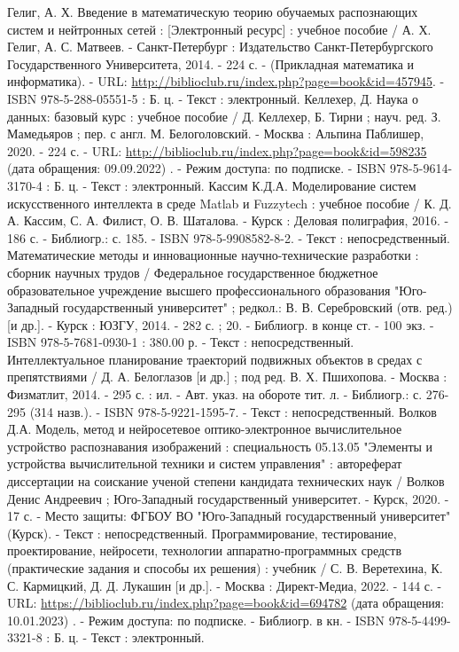 \begin{thebibliography}{50}
    Гелиг, А. Х.    Введение в математическую теорию обучаемых распознающих систем и нейтронных сетей : [Электронный ресурс] : учебное пособие / А. Х. Гелиг, А. С. Матвеев. - Санкт-Петербург : Издательство Санкт-Петербургского Государственного Университета, 2014. - 224 с. - (Прикладная математика и информатика). - URL: \url{http://biblioclub.ru/index.php?page=book&id=457945}. - ISBN 978-5-288-05551-5 : Б. ц. - Текст : электронный.
     Келлехер, Д.    Наука о данных: базовый курс : учебное пособие / Д. Келлехер, Б. Тирни ; науч. ред. З. Мамедьяров ; пер. с англ. М. Белоголовский. - Москва : Альпина Паблишер, 2020. - 224 с. - URL: \url{http://biblioclub.ru/index.php?page=book&id=598235} (дата обращения: 09.09.2022) . - Режим доступа: по подписке. - ISBN 978-5-9614-3170-4 : Б. ц. - Текст : электронный.
     Кассим К.Д.А.   Моделирование систем искусственного интеллекта в среде Matlab и Fuzzytech : учебное пособие / К. Д. А. Кассим, С. А. Филист, О. В. Шаталова. - Курск : Деловая полиграфия, 2016. - 186 с. - Библиогр.: с. 185. - ISBN 978-5-9908582-8-2. - Текст : непосредственный.
     Математические методы и инновационные научно-технические разработки : сборник научных трудов / Федеральное государственное бюджетное образовательное учреждение высшего профессионального образования "Юго-Западный государственный университет" ; редкол.: В. В. Серебровский (отв. ред.) [и др.]. - Курск : ЮЗГУ, 2014. - 282 с. ; 20. - Библиогр. в конце ст. - 100 экз. - ISBN 978-5-7681-0930-1 : 380.00 р. - Текст : непосредственный.
     Интеллектуальное планирование траекторий подвижных объектов в средах с препятствиями / Д. А. Белоглазов [и др.] ; под ред. В. Х. Пшихопова. - Москва : Физматлит, 2014. - 295 с. : ил. - Авт. указ. на обороте тит. л. - Библиогр.: с. 276-295 (314 назв.). - ISBN 978-5-9221-1595-7. - Текст : непосредственный.
     Волков Д.А.  Модель, метод и нейросетевое оптико-электронное вычислительное устройство распознавания изображений : специальность 05.13.05 "Элементы и устройства вычислительной техники и систем управления" : автореферат диссертации на соискание ученой степени кандидата технических наук / Волков Денис Андреевич ; Юго-Западный государственный университет. - Курск, 2020. - 17 с. - Место защиты: ФГБОУ ВО "Юго-Западный государственный университет" (Курск). - Текст : непосредственный.
     Программирование, тестирование, проектирование, нейросети, технологии аппаратно‐программных средств (практические задания и способы их решения) : учебник / С. В. Веретехина, К. С. Кармицкий, Д. Д. Лукашин [и др.]. - Москва : Директ-Медиа, 2022. - 144 с. - URL: \url{https://biblioclub.ru/index.php?page=book&id=694782} (дата обращения: 10.01.2023) . - Режим доступа: по подписке. - Библиогр. в кн. - ISBN 978-5-4499-3321-8 : Б. ц. - Текст : электронный.

\end{thebibliography}
